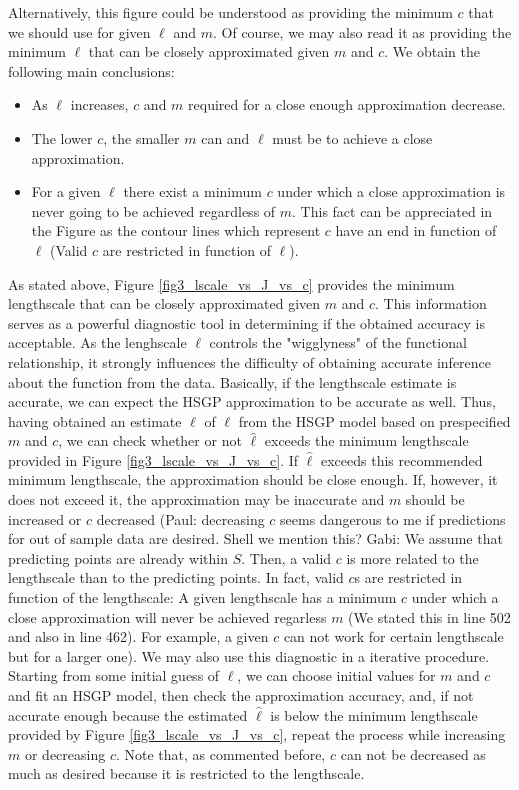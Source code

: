 \documentclass[]{interact}
\theoremstyle{plain}%
\theoremstyle{definition}
\theoremstyle{remark}
\begin{document}
\noindent Alternatively, this figure could be understood as providing the minimum $c$ that we should use for given $\ell$ and $m$. Of course, we may also read it as providing the minimum $\ell$ that can be closely approximated given $m$ and $c$. We obtain the following main conclusions:

\begin{itemize}
\item As $\ell$ increases, $c$ and $m$ required for a close enough approximation decrease.
\item The lower $c$, the smaller $m$ can and $\ell$ must be to achieve a close approximation.
\item For a given $\ell$ there exist a minimum $c$ under which a close approximation is never going to be achieved regardless of $m$. This fact can be appreciated in the Figure as the contour lines which represent $c$ have an end in function of $\ell$ (Valid $c$ are restricted in function of $\ell$).
\end{itemize}

As stated above, Figure \ref{fig3_lscale_vs_J_vs_c} provides the minimum lengthscale that can be closely approximated given $m$ and $c$. This information serves as a powerful diagnostic tool in determining if the obtained accuracy is acceptable. As the lenghscale $\ell$ controls the "wigglyness" of
the functional relationship, it strongly influences the difficulty of obtaining accurate
inference about the function from the data. Basically, if the lengthscale estimate is accurate, 
we can expect the HSGP approximation to be accurate as well. Thus, having obtained an estimate $\hat{\ell}$ of $\ell$ from the HSGP model based on prespecified $m$ and $c$, we can check whether or not $\hat{\ell}$ exceeds the minimum lengthscale provided in Figure \ref{fig3_lscale_vs_J_vs_c}. If $\hat{\ell}$ exceeds this recommended minimum lengthscale, the approximation should be close enough. If, however, it does not exceed it, the approximation may be inaccurate and $m$ should be increased or $c$ decreased (Paul: decreasing $c$ seems dangerous to me if predictions for out of sample data are desired. Shell we mention this? Gabi: We assume that predicting points are already within $S$. Then, a valid $c$ is more related to the lengthscale than to the predicting points. In fact, valid $c$s are restricted in function of the lengthscale: A given lengthscale has a minimum $c$ under which a close approximation will never be achieved regarless $m$ (We stated this in line 502 and also in line 462). For example, a given $c$ can not work for certain lengthscale but for a larger one). We may also use this diagnostic in a iterative procedure.
Starting from some initial guess of $\ell$, we can choose initial values for $m$ and $c$ and fit an HSGP model, then check the approximation accuracy, and, if not accurate enough because the estimated $\hat{\ell}$ is below the minimum lengthscale provided by Figure \ref{fig3_lscale_vs_J_vs_c}, repeat the process while increasing $m$ or decreasing $c$. Note that, as commented before, $c$ can not be decreased as much as desired because it is restricted to the lengthscale.
\end{document}
